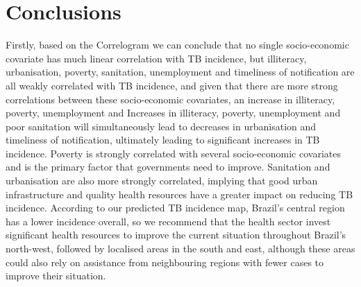 \section{Conclusions}
Firstly, based on the Correlogram we can conclude that no single socio-economic covariate has much linear correlation with TB incidence, but illiteracy, urbanisation, poverty, sanitation, unemployment and timeliness of notification are all weakly correlated with TB incidence, and given that there are more strong correlations between these socio-economic covariates, an increase in illiteracy, poverty, unemployment and Increases in illiteracy, poverty, unemployment and poor sanitation will simultaneously lead to decreases in urbanisation and timeliness of notification, ultimately leading to significant increases in TB incidence. Poverty is strongly correlated with several socio-economic covariates and is the primary factor that governments need to improve. Sanitation and urbanisation are also more strongly correlated, implying that good urban infrastructure and quality health resources have a greater impact on reducing TB incidence. According to our predicted TB incidence map, Brazil's central region has a lower incidence overall, so we recommend that the health sector invest significant health resources to improve the current situation throughout Brazil's north-west, followed by localised areas in the south and east, although these areas could also rely on assistance from neighbouring regions with fewer cases to improve their situation.
